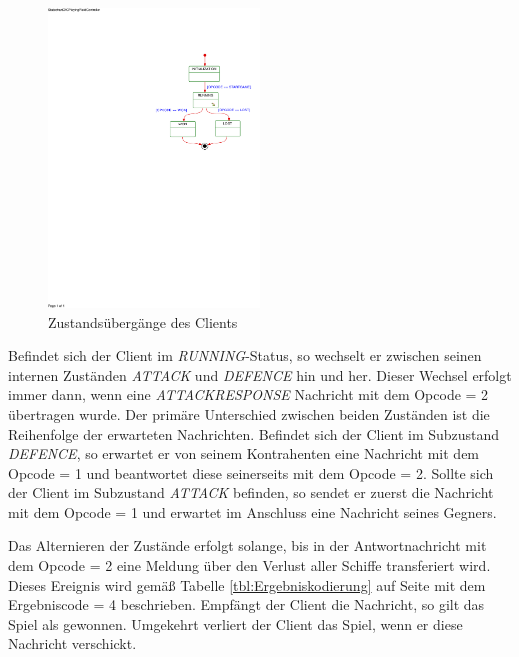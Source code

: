 \begin{figure}[H]
  \centering
  \includegraphics[trim=105mm 155mm 5mm 42mm,clip,width=0.5\textwidth]{images/SMController.pdf}
  \caption{Zustandsübergänge des Clients}
  \label{fig:Clientstates}
\end{figure}


Befindet sich der Client im \emph{RUNNING}-Status, so wechselt er zwischen seinen internen Zuständen \emph{ATTACK} und \emph{DEFENCE} hin und her.
Dieser Wechsel erfolgt immer dann, wenn eine \emph{ATTACKRESPONSE} Nachricht mit dem Opcode = 2 übertragen wurde.
Der primäre Unterschied zwischen beiden Zuständen ist die Reihenfolge der erwarteten Nachrichten.
Befindet sich der Client im Subzustand \emph{DEFENCE}, so erwartet er von seinem Kontrahenten eine Nachricht mit dem Opcode = 1 und beantwortet diese seinerseits mit dem Opcode = 2.
Sollte sich der Client im Subzustand \emph{ATTACK} befinden, so sendet er zuerst die Nachricht mit dem Opcode = 1 und erwartet im Anschluss eine Nachricht seines Gegners.

Das Alternieren der Zustände erfolgt solange, bis in der Antwortnachricht mit dem Opcode = 2 eine Meldung über den Verlust aller Schiffe transferiert wird.
Dieses Ereignis wird gemäß Tabelle \ref{tbl:Ergebniskodierung} auf Seite \pageref{tbl:Ergebniskodierung} mit dem Ergebniscode = 4 beschrieben.
Empfängt der Client die Nachricht, so gilt das Spiel als gewonnen.
Umgekehrt verliert der Client das Spiel, wenn er diese Nachricht verschickt.

